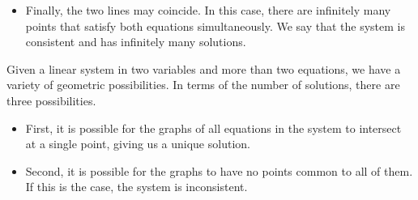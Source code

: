\documentclass{ximera}
\begin{document}
\begin{exploration}
\begin{itemize}
\begin{center}
\begin{tikzpicture}
            \end{tikzpicture}
            \end{center}
          \item Finally, the two lines may coincide.  In this case, there are infinitely many points that satisfy both equations simultaneously.  We say that the system is consistent and has infinitely many solutions.
          \begin{center}
          \end{center}
          \end{itemize}
      
                  Given a linear system in two variables and more than two equations, we have a variety of geometric possibilities.  In terms of the number of solutions, there are three possibilities.
       
                  \begin{itemize}
                  \item First, it is possible for the graphs of all equations in the system to intersect at a single point, giving us a unique solution. 
                   
                  \begin{center}
                  \end{center}
                   
                  \item Second, it is possible for the graphs to have no points common to all of them.  If this is the case, the system is inconsistent.
                   

\end{itemize}
\end{exploration}
\end{document}
